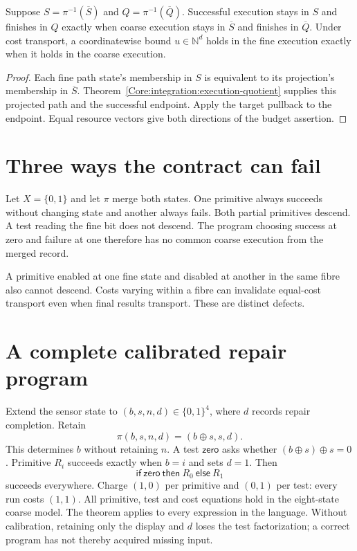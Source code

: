 \begin{Corecorollary}
Suppose $S=\pi^{-1}(\overline S)$ and $Q=\pi^{-1}(\overline Q)$. Successful execution stays in $S$ and finishes in $Q$ exactly when coarse execution stays in $\overline S$ and finishes in $\overline Q$. Under cost transport, a coordinatewise bound $u\in\mathbb N^d$ holds in the fine execution exactly when it holds in the coarse execution.
\end{Corecorollary}
\begin{proof}
Each fine path state's membership in $S$ is equivalent to its projection's membership in $\overline S$. Theorem~\ref{Core:integration:execution-quotient} supplies this projected path and the successful endpoint. Apply the target pullback to the endpoint. Equal resource vectors give both directions of the budget assertion.
\end{proof}

\section{Three ways the contract can fail}
\begin{Corecounterexample}
Let $X=\{0,1\}$ and let $\pi$ merge both states. One primitive always succeeds without changing state and another always fails. Both partial primitives descend. A test reading the fine bit does not descend. The program choosing success at zero and failure at one therefore has no common coarse execution from the merged record.
\end{Corecounterexample}
A primitive enabled at one fine state and disabled at another in the same fibre also cannot descend. Costs varying within a fibre can invalidate equal-cost transport even when final results transport. These are distinct defects.

\section{A complete calibrated repair program}
Extend the sensor state to $(b,s,n,d)\in\{0,1\}^4$, where $d$ records repair completion. Retain
\[
\pi(b,s,n,d)=(b\mathbin\oplus s,s,d).
\]
This determines $b$ without retaining $n$. A test $\mathsf{zero}$ asks whether $(b\oplus s)\oplus s=0$. Primitive $R_i$ succeeds exactly when $b=i$ and sets $d=1$. Then
\[
\mathsf{if\ zero\ then}\ R_0\ \mathsf{else}\ R_1
\]
succeeds everywhere. Charge $(1,0)$ per primitive and $(0,1)$ per test: every run costs $(1,1)$. All primitive, test and cost equations hold in the eight-state coarse model. The theorem applies to every expression in the language. Without calibration, retaining only the display and $d$ loses the test factorization; a correct program has not thereby acquired missing input.

